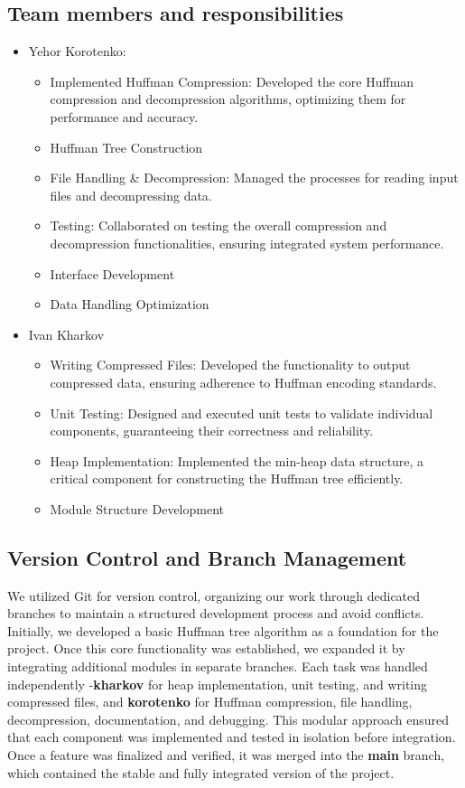 \documentclass[12pt,oneside,letterpaper,english]{article}
\begin{document}
\subsection*{Team members and responsibilities}
\begin{itemize}
    \item Yehor Korotenko:
        \begin{itemize}
            \item Implemented Huffman Compression: Developed the core Huffman compression and decompression algorithms, optimizing them for performance and accuracy.
            \item Huffman Tree Construction
            \item File Handling \& Decompression: Managed the processes for reading input files and decompressing data.
            \item Testing: Collaborated on testing the overall compression and decompression functionalities, ensuring integrated system performance.
            \item Interface Development
            \item Data Handling Optimization
        \end{itemize}
    \item Ivan Kharkov
        \begin{itemize}
            \item Writing Compressed Files: Developed the functionality to output compressed data, ensuring adherence to Huffman encoding standards.
            \item Unit Testing: Designed and executed unit tests to validate individual components, guaranteeing their correctness and reliability.
            \item Heap Implementation: Implemented the min-heap data structure, a critical component for constructing the Huffman tree efficiently.
            \item Module Structure Development
        \end{itemize}
\end{itemize}

\subsection*{Version Control and Branch Management}
We utilized Git for version control, organizing our work through dedicated branches to maintain a structured development process and avoid conflicts. Initially, we developed a basic Huffman tree algorithm as a foundation for the project. Once this core functionality was established, we expanded it by integrating additional modules in separate branches. Each task was handled independently -\textbf{kharkov} for heap implementation, unit testing, and writing compressed files, and \textbf{korotenko} for Huffman compression, file handling, decompression, documentation, and debugging. This modular approach ensured that each component was implemented and tested in isolation before integration. Once a feature was finalized and verified, it was merged into the \textbf{main} branch, which contained the stable and fully integrated version of the project.
\end{document}
